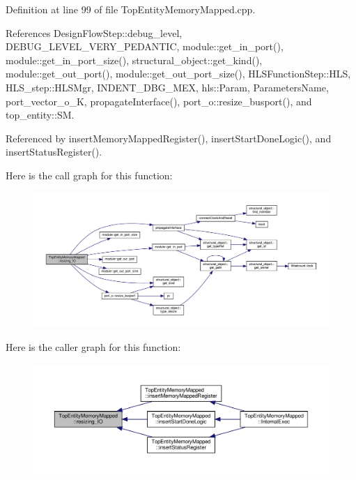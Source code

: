 Definition at line 99 of file Top\+Entity\+Memory\+Mapped.\+cpp.



References Design\+Flow\+Step\+::debug\+\_\+level, D\+E\+B\+U\+G\+\_\+\+L\+E\+V\+E\+L\+\_\+\+V\+E\+R\+Y\+\_\+\+P\+E\+D\+A\+N\+T\+IC, module\+::get\+\_\+in\+\_\+port(), module\+::get\+\_\+in\+\_\+port\+\_\+size(), structural\+\_\+object\+::get\+\_\+kind(), module\+::get\+\_\+out\+\_\+port(), module\+::get\+\_\+out\+\_\+port\+\_\+size(), H\+L\+S\+Function\+Step\+::\+H\+LS, H\+L\+S\+\_\+step\+::\+H\+L\+S\+Mgr, I\+N\+D\+E\+N\+T\+\_\+\+D\+B\+G\+\_\+\+M\+EX, hls\+::\+Param, Parameters\+Name, port\+\_\+vector\+\_\+o\+\_\+K, propagate\+Interface(), port\+\_\+o\+::resize\+\_\+busport(), and top\+\_\+entity\+::\+SM.



Referenced by insert\+Memory\+Mapped\+Register(), insert\+Start\+Done\+Logic(), and insert\+Status\+Register().

Here is the call graph for this function\+:
\nopagebreak
\begin{figure}[H]
\begin{center}
\leavevmode
\includegraphics[width=350pt]{d1/db6/classTopEntityMemoryMapped_a91b1fe9c30ef902d4857cc34d4270775_cgraph}
\end{center}
\end{figure}
Here is the caller graph for this function\+:
\nopagebreak
\begin{figure}[H]
\begin{center}
\leavevmode
\includegraphics[width=350pt]{d1/db6/classTopEntityMemoryMapped_a91b1fe9c30ef902d4857cc34d4270775_icgraph}
\end{center}
\end{figure}


